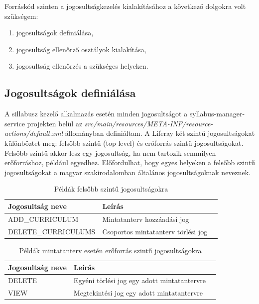 \documentclass[hidelinks, 12pt, a4paper]{report}
\begin{document}
Forráskód szinten a jogosultságkezelés kialakításához a következő dolgokra volt szükségem:
\begin{enumerate}
\item jogosultságok definiálása,
\item jogosultság ellenőrző osztályok kialakítása,
\item jogosultság ellenőrzés a szükséges helyeken.
\end{enumerate}

\subsection{Jogosultságok definiálása}

A sillabusz kezelő alkalmazás esetén minden jogosultságot a syllabus-manager-service projekten belül az \emph{src/main/resources/META-INF/resource-actions/default.xml} állományban definiáltam. A Liferay két szintű jogosultságokat különböztet meg: felsőbb szintű (top level) és erőforrás szintű jogosultságokat. Felsőbb szintű akkor lesz egy jogosultság, ha nem tartozik semmilyen erőforráshoz, például egyedhez. Előfordulhat, hogy egyes helyeken a felsőbb szintű jogosultságokat a magyar szakirodalomban általános jogosultságoknak neveznek.

\begin{table}[H]
	\caption{Példák felsőbb szintű jogosultságokra}
	\centering
	\begin{tabular}{| l | l | l |}
	\hline
	\textbf{Jogosultság neve} & \textbf{Leírás} \\
	\hline
	ADD\_CURRICULUM & Mintatanterv hozzáadási jog \\
	\hline
	DELETE\_CURRICULUMS & Csoportos mintatanterv törlési jog \\
	\hline
\end{tabular}
\end{table}

\begin{table}[H]
	\caption{Példák mintatanterv esetén erőforrás szintű jogosultságokra}
	\centering
	\begin{tabular}{| l | l | l |}
	\hline
	\textbf{Jogosultság neve} & \textbf{Leírás} \\
	\hline
	DELETE & Egyéni törlési jog egy adott mintatantervre \\
	\hline
	VIEW & Megtekintési jog egy adott mintatantervre \\
	\hline
\end{tabular}
\end{table}
\end{document}
